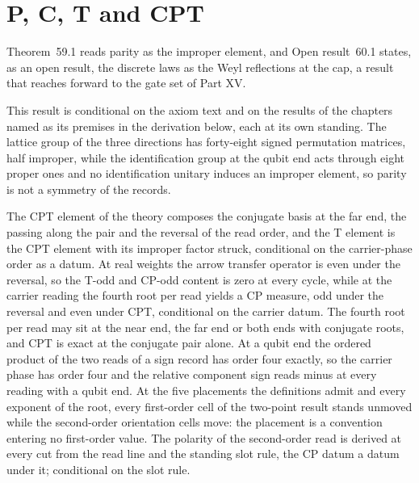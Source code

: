 \section{P, C, T and CPT}\label{mod:III-6-p-c-t-and-cpt}
\label{narr:open:3-6}Theorem~59.1 reads parity as the improper element, and Open result~60.1 states, as an open result, the discrete laws as the Weyl reflections at the cap, a result that reaches forward to the gate set of Part XV.
\begin{chconditional}\label{box:III-6-p-c-t-and-cpt:1}
This result is conditional on the axiom text and on the results of the chapters named as its premises in the derivation below, each at its own standing.
The lattice group of the three directions has forty-eight signed permutation matrices, half improper, while the identification group at the qubit end acts through eight proper ones and no identification unitary induces an improper element, so parity is not a symmetry of the records.
\end{chconditional}
The CPT element of the theory composes the conjugate basis at the far end, the passing along the pair and the reversal of the read order, and the T element is the CPT element with its improper factor struck, conditional on the carrier-phase order as a datum.
At real weights the arrow transfer operator is even under the reversal, so the T-odd and CP-odd content is zero at every cycle, while at the carrier reading the fourth root per read yields a CP measure, odd under the reversal and even under CPT, conditional on the carrier datum.
The fourth root per read may sit at the near end, the far end or both ends with conjugate roots, and CPT is exact at the conjugate pair alone.
At a qubit end the ordered product of the two reads of a sign record has order four exactly, so the carrier phase has order four and the relative component sign reads minus at every reading with a qubit end.
At the five placements the definitions admit and every exponent of the root, every first-order cell of the two-point result stands unmoved while the second-order orientation cells move: the placement is a convention entering no first-order value.
The polarity of the second-order read is derived at every cut from the read line and the standing slot rule, the CP datum a datum under it; conditional on the slot rule.
